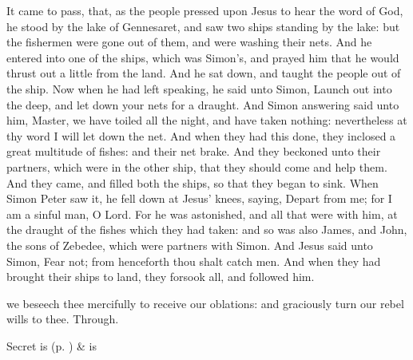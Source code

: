 
\clearpage
{}
 It came to pass, that, as the people pressed upon Jesus to hear the word of God, he stood by the lake of Gennesaret, and saw two ships standing by the lake: but the fishermen were gone out of them, and were washing their nets. And he entered into one of the ships, which was Simon's, and prayed him that he would thrust out a little from the land. And he sat down, and taught the people out of the ship. Now when he had left speaking, he said unto Simon, Launch out into the deep, and let down your nets for a draught. And Simon answering said unto him, Master, we have toiled all the night, and have taken nothing: nevertheless at thy word I will let down the net. And when they had this done, they inclosed a great multitude of fishes: and their net brake. And they beckoned unto their partners, which were in the other ship, that they should come and help them. And they came, and filled both the ships, so that they began to sink. When Simon Peter saw it, he fell down at Jesus' knees, saying, Depart from me; for I am a sinful man, O Lord. For he was astonished, and all that were with him, at the draught of the fishes which they had taken: and so was also James, and John, the sons of Zebedee, which were partners with Simon. And Jesus said unto Simon, Fear not; from henceforth thou shalt catch men. And when they had brought their ships to land, they forsook all, and followed him.


\secret
{} we beseech thee mercifully to receive our oblations: and graciously turn our rebel wills to thee. Through.


\begin{rubric}
     Secret is  (p. \pageref{SPSaints}) \&  is 
\end{rubric}


